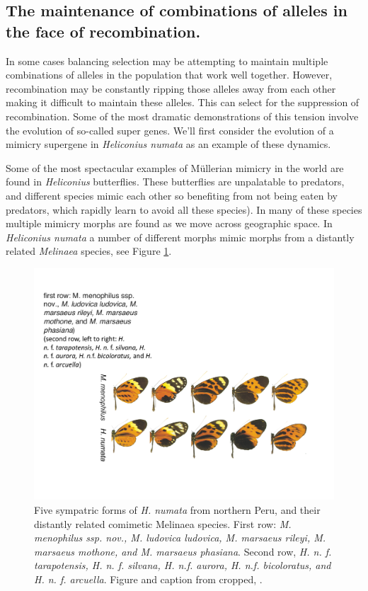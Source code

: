\subsection{The maintenance of combinations of alleles in the face of recombination.} \label{epistasis_inversion}

In some cases balancing selection may be attempting to maintain multiple combinations of alleles in the population that work well together. However, recombination may be constantly ripping those alleles away from each other making it difficult to maintain these alleles. This can select for the suppression of recombination. Some of the most dramatic demonstrations of this tension involve the evolution of so-called super genes. We'll first consider the evolution of a mimicry supergene in {\it Heliconius numata} as an example of these dynamics.  

Some of the most spectacular examples of M{\"u}llerian mimicry in the world are found in {\it Heliconius} butterflies. These butterflies are unpalatable to predators, and different species mimic each other so benefiting from not being eaten by predators, which rapidly learn to avoid all these species). In many of these species multiple mimicry morphs are found as we move across geographic space. In  {\it Heliconius numata} a number of different morphs mimic morphs from a distantly related {\it Melinaea} species, see Figure \ref{fig:H_numata}.

\begin{figure} %
\begin{center}
  \includegraphics[width = \textwidth]{Journal_figs/recom_selection/H_numata/H_numata.pdf}
\end{center}
\caption{Five sympatric forms of {\it H. numata} from northern Peru, and their distantly related comimetic Melinaea species.  First row: {\it M. menophilus ssp. nov., M. ludovica ludovica, M. marsaeus rileyi, M. marsaeus mothone, and M. marsaeus phasiana}. Second row, {\it H. n. f. tarapotensis, H. n. f. silvana, H. n.f. aurora, H. n.f. bicoloratus, and H. n. f. arcuella}. Figure and caption from \citet{joron2006conserved} cropped, \PLOSccBY. } \label{fig:H_numata}  %
\end{figure}

